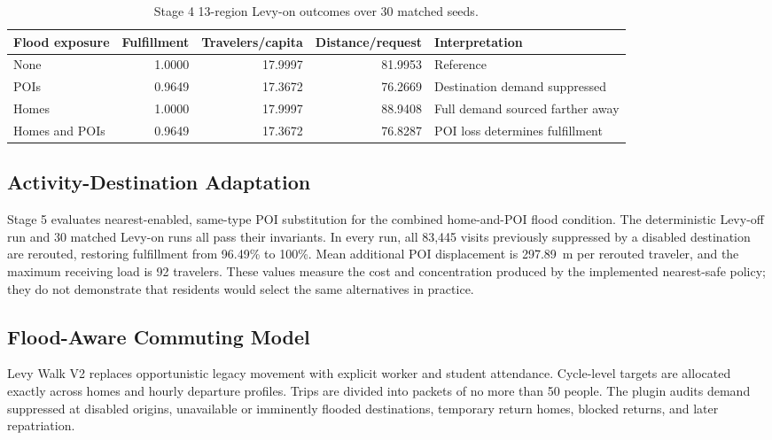 \documentclass[pdflatex,sn-mathphys-num]{sn-jnl}%
\theoremstyle{thmstyleone}%
\theoremstyle{thmstyletwo}%
\theoremstyle{thmstylethree}%
\begin{document}
\begin{table}[ht]
\centering
\footnotesize
\caption{Stage 4 13-region Levy-on outcomes over 30 matched seeds.}
\label{tbl:popular_core}
\begin{tabularx}{\linewidth}{@{}lrrrX@{}}
\toprule
\textbf{Flood exposure} & \textbf{Fulfillment} & \textbf{Travelers/capita} & \textbf{Distance/request} & \textbf{Interpretation} \\ \midrule
None & 1.0000 & 17.9997 & 81.9953 & Reference \\ 
POIs & 0.9649 & 17.3672 & 76.2669 & Destination demand suppressed \\ 
Homes & 1.0000 & 17.9997 & 88.9408 & Full demand sourced farther away \\ 
Homes and POIs & 0.9649 & 17.3672 & 76.8287 & POI loss determines fulfillment \\ \bottomrule
\end{tabularx}
\end{table}



\subsection{Activity-Destination Adaptation}
Stage 5 evaluates nearest-enabled, same-type POI substitution for the combined home-and-POI flood condition. The deterministic Levy-off run and 30 matched Levy-on runs all pass their invariants. In every run, all 83,445 visits previously suppressed by a disabled destination are rerouted, restoring fulfillment from 96.49\% to 100\%. Mean additional POI displacement is 297.89~m per rerouted traveler, and the maximum receiving load is 92 travelers. These values measure the cost and concentration produced by the implemented nearest-safe policy; they do not demonstrate that residents would select the same alternatives in practice.



\subsection{Flood-Aware Commuting Model}
Levy Walk V2 replaces opportunistic legacy movement with explicit worker and student attendance. Cycle-level targets are allocated exactly across homes and hourly departure profiles. Trips are divided into packets of no more than 50 people. The plugin audits demand suppressed at disabled origins, unavailable or imminently flooded destinations, temporary return homes, blocked returns, and later repatriation.
\end{document}
